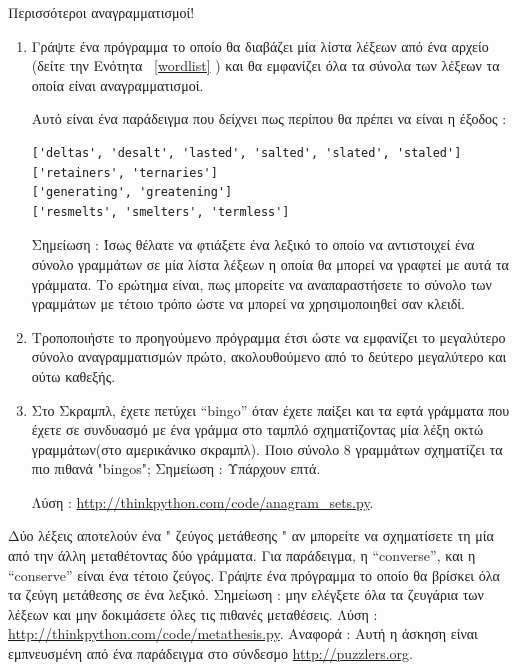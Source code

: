 \documentclass[10pt]{book}
\begin{document}
\begin{exercise}
\label{anagrams}

Περισσότεροι αναγραμματισμοί!

\begin{enumerate}

\item Γράψτε ένα πρόγραμμα το οποίο θα διαβάζει μία λίστα λέξεων από ένα αρχείο (δείτε την Ενότητα ~\ref{wordlist} ) και θα εμφανίζει όλα τα σύνολα των λέξεων τα οποία είναι αναγραμματισμοί.

Αυτό είναι ένα παράδειγμα που δείχνει πως περίπου θα πρέπει να είναι η έξοδος :

\begin{verbatim}
['deltas', 'desalt', 'lasted', 'salted', 'slated', 'staled']
['retainers', 'ternaries']
['generating', 'greatening']
['resmelts', 'smelters', 'termless']
\end{verbatim}
%
 Σημείωση :  Ίσως θέλατε να φτιάξετε ένα λεξικό το οποίο να αντιστοιχεί ένα σύνολο γραμμάτων σε μία λίστα λέξεων η οποία θα μπορεί να γραφτεί με αυτά τα γράμματα. Το ερώτημα είναι, πως μπορείτε να αναπαραστήσετε το σύνολο των γραμμάτων με τέτοιο τρόπο ώστε να μπορεί να χρησιμοποιηθεί σαν κλειδί.

\item Τροποποιήστε το προηγούμενο πρόγραμμα έτσι ώστε να εμφανίζει το μεγαλύτερο σύνολο αναγραμματισμών πρώτο, ακολουθούμενο από το δεύτερο μεγαλύτερο και ούτω καθεξής.

\item Στο Σκραμπλ, έχετε πετύχει  ``bingo''  όταν έχετε παίξει και τα εφτά γράμματα που έχετε σε συνδυασμό με ένα γράμμα στο ταμπλό σχηματίζοντας μία λέξη οκτώ γραμμάτων(στο αμερικάνικο σκραμπλ). Ποιο σύνολο 8 γραμμάτων σχηματίζει τα πιο πιθανά  
"bingos"; 
Σημείωση :  Υπάρχουν επτά.


Λύση : \url{http://thinkpython.com/code/anagram_sets.py}.

\end{enumerate}

\end{exercise}


\begin{exercise}

Δύο λέξεις αποτελούν ένα  " ζεύγος μετάθεσης "  αν μπορείτε να σχηματίσετε τη μία από την άλλη μεταθέτοντας δύο γράμματα. Για παράδειγμα, η  ``converse'',  και η  ``conserve''  είναι ένα τέτοιο ζεύγος. Γράψτε ένα πρόγραμμα το οποίο θα βρίσκει όλα τα ζεύγη μετάθεσης σε ένα λεξικό. Σημείωση :  μην ελέγξετε όλα τα ζευγάρια των λέξεων και μην δοκιμάσετε όλες τις πιθανές μεταθέσεις. Λύση : \url{http://thinkpython.com/code/metathesis.py}.  
Αναφορά :  Αυτή η άσκηση είναι εμπνευσμένη από ένα παράδειγμα στο σύνδεσμο  \url{http://puzzlers.org}.

\end{exercise}
\end{document}
